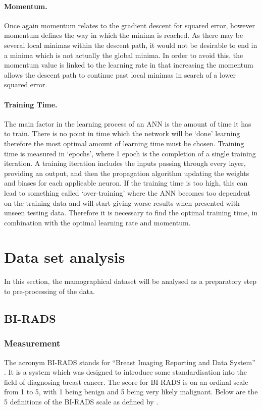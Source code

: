 \documentclass[12pt]{article}
\begin{document}
      \paragraph{Momentum.}
        Once again momentum relates to the gradient descent for squared error, however momentum defines the way in which the minima is reached. As there may be several local minimas within the descent path, it would not be desirable to end in a minima which is not actually the global minima. In order to avoid this, the momentum value is linked to the learning rate in that increasing the momentum allows the descent path to continue past local minimas in search of a lower squared error.

      \paragraph{Training Time.}
        The main factor in the learning process of an ANN is the amount of time it has to train. There is no point in time which the network will be ‘done’ learning therefore the most optimal amount of learning time must be chosen. Training time is measured in ‘epochs’, where 1 epoch is the completion of a single training iteration. A training iteration includes the inputs passing through every layer, providing an output, and then the propagation algorithm updating the weights and biases for each applicable neuron. If the training time is too high, this can lead to something called ‘over-training’ where the ANN becomes too dependent on the training data and will start giving worse results when presented with unseen testing data. Therefore it is necessary to find the optimal training time, in combination with the optimal learning rate and momentum.

\section{Data set analysis} \label{data-set-analysis}
  In this section, the mamographical dataset will be analysed as a preparatory step to pre-processing of the data.

    \subsection{BI-RADS} \label{birad}
      \subsubsection{Measurement}
        The acronym BI-RADS stands for “Breast Imaging Reporting and Data System” \citep{american1998breast}. It is a system which was designed to introduce some standardisation into the field of diagnosing breast cancer. The score for BI-RADS is on an ordinal scale from 1 to 5, with 1 being benign and 5 being very likely malignant.
        Below are the 5 definitions of the BI-RADS scale as defined by \cite{american1998breast}.
\end{document}
